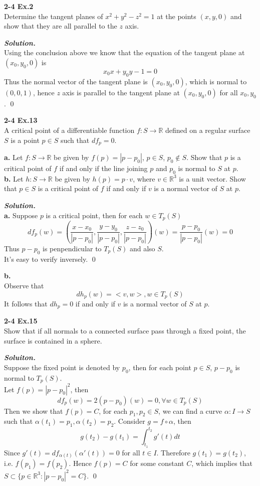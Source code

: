 \documentclass{article}
\begin{document}
\par
\textbf{2-4 Ex.2}\\
Determine the tangent planes of $x^2+y^2-z^2=1$ at the points
$(x,y,0)$ and show that they are all parallel to the $z$
axis.

\par
\textbf{\textit{Solution.}}\\
Using the conclusion above we know that the equation of
the tangent plane at $(x_0,y_0,0)$ is
$$
    x_0x+y_0y-1=0
$$
Thus the normal vector of the tangent plane is $(x_0,y_0,0)$,
which is normal to $(0,0,1)$, hence $z$ axis is parallel to
the tangent plane at $(x_0,y_0,0)$ for all $x_0,y_0$. \qed

\par
\textbf{2-4 Ex.13}\\
A critical point of a differentiable function $f: S \to \mathbb{R}$
defined on a regular surface $S$ is a point $p \in S$ such
that $df_p=0$.

\par
\textbf{a. }Let $f:S\to \mathbb{R}$ be given by $f(p)=|p-p_0|$,
$p \in S$, $p_0 \notin S$. Show that $p$ is a critical point
of $f$ if and only if the line joining $p$ and $p_0$ is
normal to $S$ at $p$.\\
\textbf{b. }Let $h:S \to \mathbb{R}$ be given by $h(p)=p \cdot v$,
where $v \in \mathbb{R}^3$ is a unit vector. Show that $p \in S$
is a critical point of $f$ if and only if $v$ is a normal
vector of $S$ at $p$.

\par
\textbf{\textit{Solution.}}\\
\textbf{a. }Suppose $p$ is a critical point, then for each $w \in T_p(S)$
$$
    df_p(w)=(\frac{x-x_0}{|p-p_0|}, \frac{y-y_0}{|p-p_0|}, \frac{z-z_0}{|p-p_0|})(w)=\frac{p-p_0}{|p-p_0|}(w)=0
$$
Thus $p-p_0$ is penpendicular to $T_p(S)$ and also $S$.\\
It's easy to verify inversely. \qed

\textbf{b. }\\
Observe that
$$
    dh_p(w) = <v,w>, w \in T_p(S)
$$
It follows that $dh_p=0$ if and only if $v$ is a normal
vector of $S$ at $p$.

\par
\textbf{2-4 Ex.15}\\
Show that if all normals to a connected surface pass through
a fixed point, the surface is contained in a sphere.

\par
\textbf{\textit{Soluiton.}}\\
Suppose the fixed point is denoted by $p_0$, then for each 
point $p \in S$, $p-p_0$ is normal to $T_p(S)$.\\
Let $f(p)=|p-p_0|^2$, then
$$
    df_p(w)=2(p-p_0)(w)=0, \forall w \in T_p(S)
$$
Then we show that $f(p)=C$, for each $p_1,p_2 \in S$,
we can find a curve $\alpha: I \to S$ such that
$\alpha(t_1)=p_1, \alpha(t_2)=p_2$. Consider
$g = f \circ \alpha$, then
$$
    g(t_2)-g(t_1) = \int_{t_1}^{t_2}g'(t)dt
$$
Since $g'(t)=df_{\alpha(t)}(\alpha'(t)) = 0$ for all $t \in I$.
Therefore $g(t_1)=g(t_2)$, i.e. $f(p_1)=f(p_2)$.
Hence $f(p)=C$ for some constant $C$, which implies that
$S \subset \{p\in \mathbb{R}^3:|p-p_0|^2=C\}$. \qed
\end{document}
